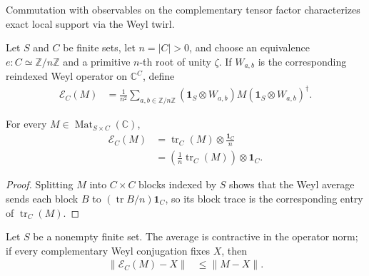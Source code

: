 Commutation with observables on the complementary tensor factor characterizes
exact local support via the Weyl twirl.

\begin{definition}
    \label{def:qca_complementary_weyl_twirl}
    \leanok
    Let $S$ and $C$ be finite sets, let $n=|C|>0$, and choose an equivalence
    $e\colon C\simeq\mathbb Z/n\mathbb Z$ and a primitive $n$-th root of unity
    $\zeta$.  If $W_{a,b}$ is the corresponding reindexed Weyl operator on
    $\mathbb C^C$, define
    \begin{align}
        \mathcal E_C(M)
         & = \frac{1}{n^2}\sum_{a,b\in\mathbb Z/n\mathbb Z}
        (\mathbf 1_S\otimes W_{a,b})M
        (\mathbf 1_S\otimes W_{a,b})^\dagger.
    \end{align}
\end{definition}

\begin{lemma}
    \label{lem:qca_complementary_weyl_twirl_eq}
    \leanok
    For every $M\in\operatorname{Mat}_{S\times C}(\mathbb C)$,
    \begin{align}
        \mathcal E_C(M)
         & = \operatorname{tr}_C(M)\otimes\frac{\mathbf 1_C}{n}                \\
         & = \left(\frac{1}{n}\operatorname{tr}_C(M)\right)\otimes\mathbf 1_C.
    \end{align}
\end{lemma}

\begin{proof}\leanok
    Splitting $M$ into $C\times C$ blocks indexed by $S$ shows that the Weyl average sends
    each block $B$ to $(\operatorname{tr}B/n)\mathbf 1_C$, so its block trace is
    the corresponding entry of $\operatorname{tr}_C(M)$.
\end{proof}

\begin{lemma}
    \label{lem:qca_complementary_weyl_twirl_norm}
    \leanok
    Let $S$ be a nonempty finite set.  The average is contractive in the
    operator norm; if every complementary Weyl conjugation fixes $X$, then
    \begin{align}
        \lVert\mathcal E_C(M)-X\rVert
         & \le \lVert M-X\rVert.
    \end{align}
\end{lemma}

